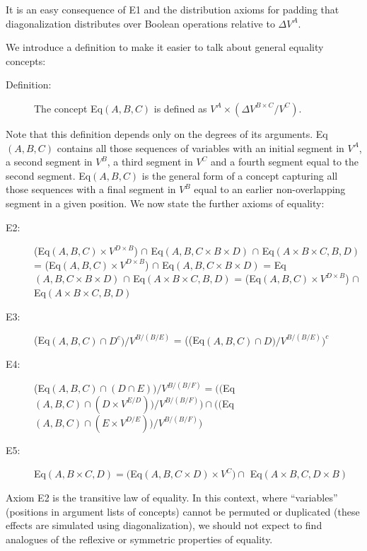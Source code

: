 It is an easy consequence of E1 and the distribution axioms for
padding that diagonalization distributes over Boolean operations
relative to $\Delta V^A$.

We introduce a definition to make it easier to talk about general
equality concepts:

\begin{description}

\item[Definition:] The concept Eq$(A,B,C)$ is defined as
$V^A\times(\Delta V^{B\times C}/V^C)$.  

\end{description}

Note that this definition depends only on the degrees of its
arguments.  Eq$(A,B,C)$ contains all those sequences of variables with
an initial segment in $V^A$, a second segment in $V^B$, a third
segment in $V^C$ and a fourth segment equal to the second
segment. Eq$(A,B,C)$ is the general form of a concept capturing all
those sequences with a final segment in $V^B$ equal to an earlier
non-overlapping segment in a given position.
We now state the further axioms of equality:

\begin{description}

\item[E2:] (Eq$(A,B,C) \times V^{D\times B}$) $\cap$ Eq$(A,B,C\times B
\times D)$ $\cap$ Eq$(A\times B \times C,B,D)$ = (Eq$(A,B,C) \times
V^{D\times B}$) $\cap$ Eq$(A,B,C\times B \times D)$ = Eq$(A,B,C\times
B \times D)$ $\cap$ Eq$(A\times B \times C,B,D)$ = (Eq$(A,B,C) \times
V^{D\times B}$) $\cap$ Eq$(A\times B \times C,B,D)$

\item[E3:]  (Eq$(A,B,C) \cap D^c)/V^{B/(B/E)}$ = ((Eq$(A,B,C) \cap D)/V^{B/(B/E)})^c$

\item[E4:]  (Eq$(A,B,C) \cap (D\cap E))/V^{B/(B/F)} =
(($Eq$(A,B,C) \cap (D\times V^{E/D}))/V^{B/(B/F)}) \cap (($Eq$(A,B,C) \cap (E\times V^{D/E}))/V^{B/(B/F)})$

\item[E5:] Eq$(A,B\times C,D) = ($Eq$(A,B,C\times D)\times V^C)\cap$
Eq$(A\times B,C,D \times B)$

\end{description}
Axiom E2 is the transitive law of equality.  In this context, where
``variables'' (positions in argument lists of concepts) cannot be
permuted or duplicated (these effects are simulated using
diagonalization), we should not expect to find analogues of the
reflexive or symmetric properties of equality.

